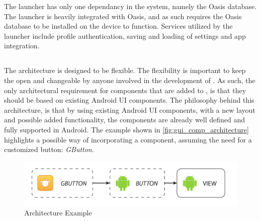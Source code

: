 The \giraf[] launcher has only one dependancy in the \giraf[] system, namely the Oasis database. 
The launcher is heavily integrated with Oasis, and as such requires the Oasis database to be installed on the device to function. 
Services utilized by the launcher include profile authentication, saving and loading of settings and app integration. 

\subsection{\guicomponents[]}
The \guicomponents[] architecture is designed to be flexible. 
The flexibility is important to keep the \guicomponents[] open and changeable by anyone involved in the development of \giraf[]. 
As such, the only architectural requirement for components that are added to \guicomponents[], is that they should be based on existing Android UI components. 
The philosophy behind this architecture, is that by using existing Android UI components, with a new layout and possible added functionality, the components are already well defined and fully supported in Android. 
The example shown in \autoref{fig:gui_comp_architecture} highlights a possible way of incorporating a component, assuming the need for a customized button: \textit{GButton}. 
\begin{figure}[h]
	\centering
	\includegraphics[width=1\textwidth]{gfx/gui_components_architecture.pdf}
	\caption{\guicomponents[] Architecture Example}
	\label{fig:gui_comp_architecture}
\end{figure}
